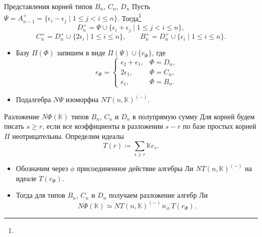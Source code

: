 \documentclass[12pt,aspectratio=169]{beamer}
\newcommand{\K}{\mathbb{K}}
\newcommand{\sourcefootnote}[1]{\footnote{\slidecite{#1}}}
\begin{document}
\begin{frame}[t]{Представления корней типов $B_n$, $C_n$, $D_n$}
    \small
    Пусть $\Psi=A_{n-1}^+=\{\epsilon_i-\epsilon_j \mid 1\leq j<i\leq n\}$.
    Тогда\sourcefootnote{bourbaki72}
    \[
        D_n^+=\Psi\cup\{\epsilon_i+\epsilon_j \mid 1\le j<i\le n\},
    \]
    \[
        C_n^+=D_n^+\cup\{2\epsilon_i \mid 1\le i\le n\},
        \qquad
        B_n^+=D_n^+\cup\{\epsilon_i \mid 1\le i\le n\}.
    \]

    \begin{itemize}
        \item Базу $\Pi(\Phi)$ запишем в виде $\Pi(\Psi)\cup\{r_\Phi\}$, где
              \[
                  r_\Phi=
                  \begin{cases}
                      \epsilon_2 + \epsilon_1, & \Phi=D_n, \\
                      2\epsilon_1,             & \Phi=C_n, \\
                      \epsilon_1,              & \Phi=B_n.
                  \end{cases}
              \]
        \item Подалгебра $N\Psi$ изоморфна $NT(n,\K)^{(-)}$.
    \end{itemize}
\end{frame}

\begin{frame}[t]{Разложение $N\Phi(\K)$ типов $B_n$, $C_n$ и $D_n$ в полупрямую сумму}
    \small
    Для корней будем писать $s\ge r$, если все коэффициенты в разложении $s-r$ по базе простых корней $\Pi$ неотрицательны. Определим идеалы
    \[
        T(r)\coloneq \sum_{s\ge r}\K e_s.
    \]

    \begin{itemize}
        \item Обозначим через $\phi$ присоединенное действие алгебры Ли $NT(n,\K)^{(-)}$ на
              идеале $T(r_\Phi)$.
        \item Тогда для типов $B_n$, $C_n$ и $D_n$ получаем разложение алгебр Ли
              \[
                  N\Phi(\K)\simeq NT(n,\K)^{(-)}\ltimes_\phi T(r_\Phi).
              \]
    \end{itemize}
\end{frame}
\end{document}
